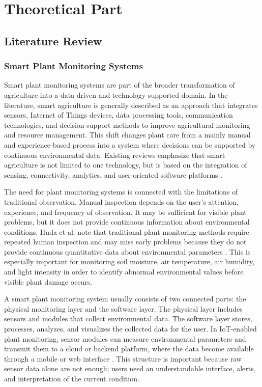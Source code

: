 \chapter{Theoretical Part}

\section{Literature Review}

\subsection{Smart Plant Monitoring Systems}

Smart plant monitoring systems are part of the broader transformation of agriculture into a data-driven and technology-supported domain. In the literature, smart agriculture is generally described as an approach that integrates sensors, Internet of Things devices, data processing tools, communication technologies, and decision-support methods to improve agricultural monitoring and resource management. This shift changes plant care from a mainly manual and experience-based process into a system where decisions can be supported by continuous environmental data. Existing reviews emphasize that smart agriculture is not limited to one technology, but is based on the integration of sensing, connectivity, analytics, and user-oriented software platforms \cite{ahmed2024smart,sophocleous2017precision,sharma2024integrating}.

The need for plant monitoring systems is connected with the limitations of traditional observation. Manual inspection depends on the user's attention, experience, and frequency of observation. It may be sufficient for visible plant problems, but it does not provide continuous information about environmental conditions. Huda et al. note that traditional plant monitoring methods require repeated human inspection and may miss early problems because they do not provide continuous quantitative data about environmental parameters \cite{huda2024iot}. This is especially important for monitoring soil moisture, air temperature, air humidity, and light intensity in order to identify abnormal environmental values before visible plant damage occurs.

A smart plant monitoring system usually consists of two connected parts: the physical monitoring layer and the software layer. The physical layer includes sensors and modules that collect environmental data. The software layer stores, processes, analyzes, and visualizes the collected data for the user. In IoT-enabled plant monitoring, sensor modules can measure environmental parameters and transmit them to a cloud or backend platform, where the data become available through a mobile or web interface \cite{huda2024iot}. This structure is important because raw sensor data alone are not enough; users need an understandable interface, alerts, and interpretation of the current condition.

